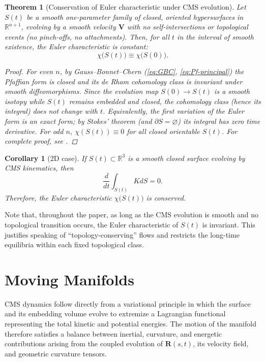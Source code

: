 \documentclass[11pt]{article}
\theoremstyle{definition}
\theoremstyle{plain}
\newtheorem{theorem}[definition]{Theorem}
\newtheorem{corollary}[definition]{Corollary}
\theoremstyle{remark}
\begin{document}
\begin{theorem}[Conservation of Euler characteristic under CMS evolution]\label{thm:chi-constant}
Let $S(t)$ be a smooth one-parameter family of closed, oriented hypersurfaces in $\mathbb{R}^{n+1}$,
evolving by a smooth velocity $\mathbf{V}$ with no self-intersections
or topological events (no pinch-offs, no attachments). Then, for all $t$ in the interval of smooth existence, the Euler characteristic is constant:
\[
\chi\bigl(S(t)\bigr)\equiv \chi\bigl(S(0)\bigr).
\]
\begin{proof}
For even $n$, by Gauss--Bonnet--Chern (\ref{eq:GBC}, \ref{eq:Pf-principal}) 
the Pfaffian form is closed and its de Rham cohomology class is invariant under smooth diffeomorphisms.
Since the evolution map $S(0)\to S(t)$ is a smooth isotopy while $S(t)$ remains embedded and closed,
the cohomology class (hence its integral) does not change with $t$.
Equivalently, the first variation of the Euler form is an exact form; by Stokes’ theorem (and $\partial S=\varnothing$)
its integral has zero time derivative. For odd $n$, $\chi(S(t))\equiv0$ for all closed orientable $S(t)$. For complete proof, see \cite{Chern1944}.
\end{proof}
\end{theorem}

\begin{corollary}[2D case]
If $S(t)\subset\mathbb{R}^3$ is a smooth closed surface evolving by CMS kinematics,
then 
\begin{equation}\label{eq:GB}
\frac{d}{dt}\int_{S(t)} K dS = 0.
\end{equation} 
Therefore, the Euler characteristic $\chi\bigl(S(t)\bigr)$ is conserved.
\end{corollary}


Note that, throughout the paper, as long as the CMS evolution is smooth and no topological transition occurs, the Euler characteristic of $S(t)$ is invariant. This justifies speaking of “topology-conserving”
flows and restricts the long-time equilibria within each fixed topological class.




\section{Moving Manifolds}

CMS dynamics follow directly from a variational principle in which the surface and its embedding volume evolve to extremize a Lagrangian functional representing the total kinetic and potential energies.  
The motion of the manifold therefore satisfies a balance between inertial, curvature, and energetic contributions arising from the coupled evolution of $\mathbf{R}(s,t)$, its velocity field, and geometric curvature tensors.
\end{document}
